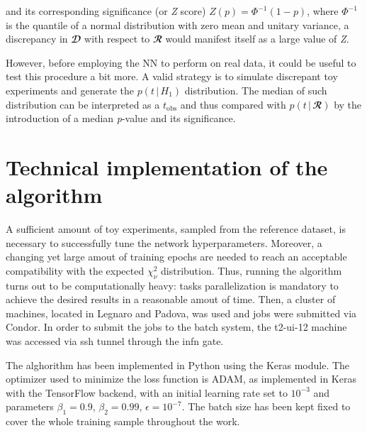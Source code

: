 \noindent and its corresponding significance (or \textit{Z} score) $Z(p)=\Phi^{-1}(1-p)$, where $\Phi^{-1}$ is the
quantile of a normal distribution with zero mean and unitary variance, a discrepancy in $\mathbfcal{D}$ with respect to
$\mathbfcal{R}$ would manifest itself as a large value of \textit{Z}.  

However, before employing the NN to perform on real data, it could be useful to test this procedure a bit more. A valid
strategy is to simulate discrepant toy experiments and generate the $p(t\,|\,H_1)$ distribution. The median of such
distribution can be interpreted as a $t_{\text{obs}}$ and thus compared with $p(t\,|\,\mathbfcal{R})$ by the
introduction of a median \textit{p}-value and its significance.

\begin{figure}[t]
	\centering
	
	\label{fig:summary}
\end{figure} 



\section{Technical implementation of the algorithm}

A sufficient amount of toy experiments, sampled from the reference dataset, is necessary to successfully tune the
network hyperparameters. Moreover, a changing yet large amout of training epochs are needed to reach an acceptable
compatibility with the expected $\chi^2_{\nu}$ distribution. Thus, running the algorithm turns out to be computationally
heavy: tasks parallelization is mandatory to achieve the desired results in a reasonable amout of time.  
Then, a cluster of machines, located in Legnaro and Padova, was used and jobs were submitted via Condor. In order to
submit the jobs to the batch system, the t2-ui-12 machine was accessed via ssh tunnel through the infn gate.

The alghorithm has been implemented in Python using the Keras module. The optimizer used to minimize the loss function
is ADAM, as implemented in Keras with the TensorFlow backend, with an initial learning rate set to $10^{-3}$ and
parameters $\beta_1=0.9$, $\beta_2=0.99$, $\epsilon=10^{-7}$. The batch size has been kept fixed to cover the whole
training sample throughout the work. 

\begin{figure}[h]
	\centering
	
	\label{fig:net}
\end{figure}  

